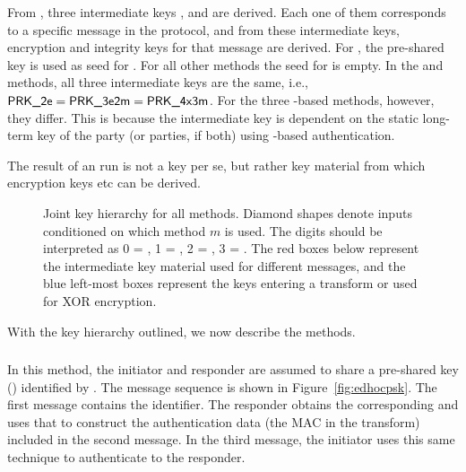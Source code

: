 From \mGxy{}, three intermediate keys \mPRKtwo, \mPRKthree{} and
\mPRKthree{} are derived.
%
Each one of them corresponds to a specific message in the protocol, and from these intermediate keys, encryption and integrity keys for that message are derived.
%
For \mPskPsk{}, the pre-shared key is used as seed for \mPRKtwo. For all other methods the seed for \mPRKtwo{} is empty.
%
In the \mPskPsk{} and \mSigSig{} methods, all three intermediate keys
are the same, i.e., $\text{\textup{\textsf{PRK\_2e}}}{} = \text{\textup{\textsf{PRK\_3e2m}}}{} = \text{\textup{\textsf{PRK\_4x3m}}}$.
%
For the three \mStat-based methods, however, they differ. This is because the intermediate key \mPRKthree{} is dependent on the static long-term key of the party (or parties, if both) using \mStat{}-based authentication.
%

The result of an \mEdhoc{} run is not a key per se, but rather key material from which encryption keys etc can be derived.

%


\begin{figure}[!h]
\scalebox{.75}{

}
\caption{Joint key hierarchy for all methods. Diamond shapes denote inputs conditioned on which method $m$ is used. The digits should be
interpreted as 0 = \mSigSig, 1 = \mSigStat, 2 = \mStatSig, 3 = \mStatStat.
The red boxes below \mGxy{} represent the intermediate key material used for different messages, and the blue left-most boxes represent the keys entering a \mAead{} transform or used for XOR encryption.}
\label{fig:kdfdiagram}
\end{figure}

With the key hierarchy outlined, we now describe the \mEdhoc{} methods.
%
%
%
\spacehack
\subsubsection{\mPskPsk{}}
In this method, the initiator and responder are assumed to share a pre-shared key (\mPsk) identified by \mIDPsk.
%
The message sequence is shown in Figure~\ref{fig:edhocpsk}.
%
The first message contains the \mIDPsk{} identifier.
%
The responder obtains the corresponding \mPsk{} and uses that to construct the authentication data (the MAC in the \mAead{} transform) included in the second message.
%
%
In the third message, the initiator uses this same technique to authenticate to the responder.
%

